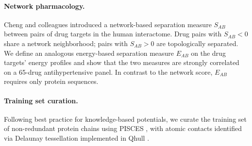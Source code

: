 \paragraph{Network pharmacology.}
Cheng and colleagues \citep{zhou2020network} introduced a network-based separation measure $S_{AB}$ between pairs of drug targets in the human interactome. Drug pairs with $S_{AB} < 0$ share a network neighborhood; pairs with $S_{AB} > 0$ are topologically separated. We define an analogous energy-based separation measure $E_{AB}$ on the drug targets' energy profiles and show that the two measures are strongly correlated on a 65-drug antihypertensive panel. In contrast to the network score, $E_{AB}$ requires only protein sequences.

\paragraph{Training set curation.}
Following best practice for knowledge-based potentials, we curate the training set of non-redundant protein chains using PISCES \citep{wang2003pisces}, with atomic contacts identified via Delaunay tessellation implemented in Qhull \citep{barber1996qhull}.
